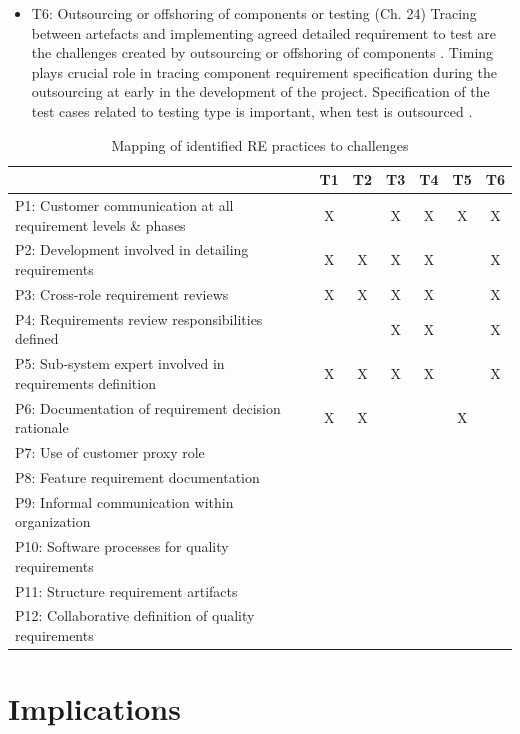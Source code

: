 \documentclass{article}
\begin{document}
\begin{itemize}
\item  T6: Outsourcing or offshoring of components or testing (Ch. 24)
Tracing between artefacts and implementing agreed detailed requirement to test are the challenges created by outsourcing or offshoring of components \cite{bjarnason2014challenges}. Timing plays crucial role in tracing component requirement specification during the outsourcing at early in the development of the project. Specification of the test cases related to testing type is important, when test is outsourced \cite{bjarnason2014challenges}.

\end{itemize}


\begin{table}[]
    \centering
    \begin{tabular}{p{6cm}|c|c|c|c|c|c}
         &  T1 & T2 & T3 & T4 & T5 & T6 \\
         \hline
        P1: Customer communication at all requirement levels \& phases & X & & X & X & X & X \\
        P2: Development involved in detailing requirements & X & X & X & X & & X \\
        P3: Cross-role requirement reviews & X & X & X & X & & X \\
        P4: Requirements review responsibilities defined  &  &  &  X & X &  &  X \\
        P5: Sub-system expert involved in requirements definition & X & X & X & X &  & X \\
        P6: Documentation of requirement decision rationale & X & X &  &  &  X &   \\
        P7: Use of customer proxy role & & & & & & \\
        P8: Feature requirement documentation & & & & & & \\
        P9: Informal communication within organization & & & & & & \\
        P10: Software processes for quality requirements & & & & & & \\
        P11: Structure requirement artifacts & & & & & & \\
        P12: Collaborative definition of quality requirements & & & & & & \\
        \hline
    \end{tabular}
    \caption{Mapping of identified RE practices to challenges}
    \label{tab:my_label}
\end{table}


\section{Implications}
\end{document}
